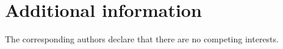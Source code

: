 \section*{Additional information}
The corresponding authors declare that there are no competing interests.